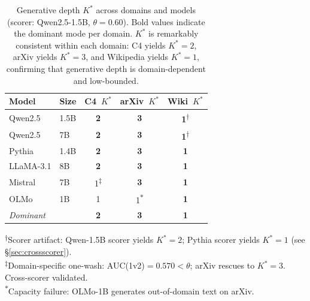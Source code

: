\begin{table}[t]
\centering
\caption{Generative depth $K^*$ across domains and models (scorer: Qwen2.5-1.5B, $\theta{=}0.60$). Bold values indicate the dominant mode per domain. $K^*$ is remarkably consistent within each domain: C4 yields $K^*{=}2$, arXiv yields $K^*{=}3$, and Wikipedia yields $K^*{=}1$, confirming that generative depth is domain-dependent and low-bounded.}
\label{tab:domain_model_kstar}
{\small
\begin{tabular}{llccc}
\toprule
\textbf{Model} & \textbf{Size} & \textbf{C4}~$K^*$ & \textbf{arXiv}~$K^*$ & \textbf{Wiki}~$K^*$ \\
\midrule
Qwen2.5       & 1.5B & \textbf{2} & \textbf{3} & \textbf{1}\textsuperscript{$\dagger$} \\
Qwen2.5       & 7B   & \textbf{2} & \textbf{3} & \textbf{1}\textsuperscript{$\dagger$} \\
Pythia        & 1.4B & \textbf{2} & \textbf{3} & \textbf{1} \\
LLaMA-3.1    & 8B   & \textbf{2} & \textbf{3} & \textbf{1} \\
Mistral       & 7B   & 1\textsuperscript{$\ddagger$} & \textbf{3} & \textbf{1} \\
OLMo          & 1B   & 1 & 1\textsuperscript{$*$} & \textbf{1} \\
\midrule
\textit{Dominant} & & \textbf{2} & \textbf{3} & \textbf{1} \\
\bottomrule
\end{tabular}
}
\vspace{2pt}

{\footnotesize
\textsuperscript{$\dagger$}Scorer artifact: Qwen-1.5B scorer yields $K^*{=}2$; Pythia scorer yields $K^*{=}1$ (see \S\ref{sec:crossscorer}).\\
\textsuperscript{$\ddagger$}Domain-specific one-wash: AUC(1v2)${=}0.570{<}\theta$; arXiv rescues to $K^*{=}3$. Cross-scorer validated.\\
\textsuperscript{$*$}Capacity failure: OLMo-1B generates out-of-domain text on arXiv.
}
\end{table}
